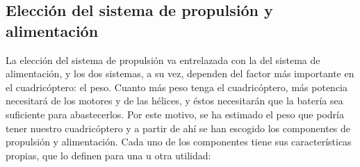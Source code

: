 \documentclass[12pt,twoside]{article}
\begin{document}
		\subsection{Elección del sistema de propulsión y alimentación}\label{subsec:componentes_prop_alim}
			
			La elección del sistema de propulsión va entrelazada con la del sistema de alimentación, y los dos sistemas, a su vez, dependen del factor más importante en el cuadricóptero: el peso. Cuanto más peso tenga el cuadricóptero, más potencia necesitará de los motores y de las hélices, y éstos necesitarán que la batería sea suficiente para abastecerlos. Por este motivo, se ha estimado el peso que podría tener nuestro cuadricóptero y a partir de ahí se han escogido los componentes de propulsión y alimentación. Cada uno de los componentes tiene sus características propias, que lo definen para una u otra utilidad:
	
\end{document}
